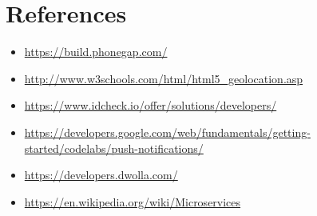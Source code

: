 \documentclass[english]{article}
\begin{document}
\section{References}
	\begin{itemize}
\item{\url{https://build.phonegap.com/}}
\item{\url{http://www.w3schools.com/html/html5_geolocation.asp}}
\item{\url{https://www.idcheck.io/offer/solutions/developers/}}
\item{\url{https://developers.google.com/web/fundamentals/getting-started/codelabs/push-notifications/}}
\item{\url{https://developers.dwolla.com/}}
\item{\url{https://en.wikipedia.org/wiki/Microservices}}
	\end{itemize}
	
\end{document}
